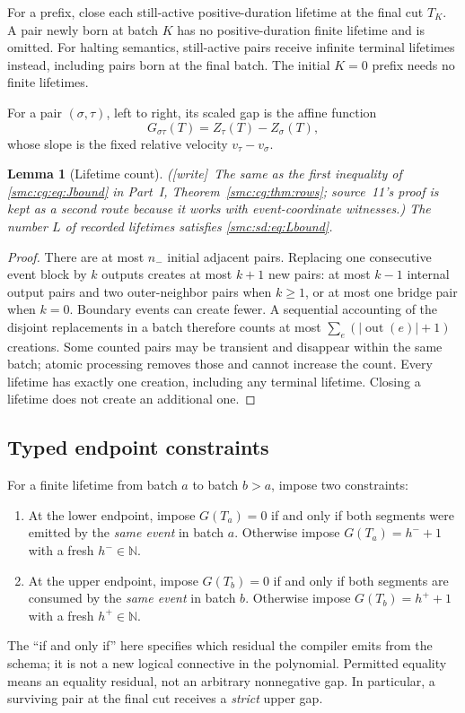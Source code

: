 \documentclass[11pt,letterpaper]{article}
\numberwithin{equation}{section}
\newtheorem{lemma}[theorem]{Lemma}
\theoremstyle{definition}
\theoremstyle{remark}
\newcommand{\NN}{\mathbb N}
\newcommand{\out}{\operatorname{out}}
\newcommand{\nminus}{n_{-}}
\newcommand{\wtag}{\textup{[write]}}
\begin{document}
For a prefix, close each still-active positive-duration lifetime at the final cut $T_K$. A pair newly born at batch $K$ has no positive-duration finite lifetime and is omitted. For halting semantics, still-active pairs receive infinite terminal lifetimes instead, including pairs born at the final batch. The initial $K=0$ prefix needs no finite lifetimes.

For a pair $(\sigma,\tau)$, left to right, its scaled gap is the affine function
\begin{equation}\label{smc:sd:eq:gap}
 G_{\sigma\tau}(T)=Z_\tau(T)-Z_\sigma(T),
\end{equation}
whose slope is the fixed relative velocity $v_\tau-v_\sigma$.

\begin{lemma}[Lifetime count]\label{smc:sd:lem:lifetimes}
(\wtag\ The same as the first inequality of \eqref{smc:cg:eq:Jbound} in Part~I, Theorem~\ref{smc:cg:thm:rows}; source~11's proof is kept as a second route because it works with event-coordinate witnesses.) The number $L$ of recorded lifetimes satisfies \eqref{smc:sd:eq:Lbound}.
\end{lemma}
\begin{proof}
There are at most $\nminus$ initial adjacent pairs. Replacing one consecutive event block by $k$ outputs creates at most $k+1$ new pairs: at most $k-1$ internal output pairs and two outer-neighbor pairs when $k\ge1$, or at most one bridge pair when $k=0$. Boundary events can create fewer. A sequential accounting of the disjoint replacements in a batch therefore counts at most $\sum_e(|\out(e)|+1)$ creations. Some counted pairs may be transient and disappear within the same batch; atomic processing removes those and cannot increase the count. Every lifetime has exactly one creation, including any terminal lifetime. Closing a lifetime does not create an additional one.
\end{proof}

\subsection{Typed endpoint constraints}\label{smc:sd:sec:endpoints}
For a finite lifetime from batch $a$ to batch $b>a$, impose two constraints:
\begin{enumerate}
\item At the lower endpoint, impose $G(T_a)=0$ if and only if both segments were emitted by the \emph{same event} in batch $a$. Otherwise impose $G(T_a)=h^-+1$ with a fresh $h^-\in\NN$.
\item At the upper endpoint, impose $G(T_b)=0$ if and only if both segments are consumed by the \emph{same event} in batch $b$. Otherwise impose $G(T_b)=h^++1$ with a fresh $h^+\in\NN$.
\end{enumerate}
The ``if and only if'' here specifies which residual the compiler emits from the schema; it is not a new logical connective in the polynomial. Permitted equality means an equality residual, not an arbitrary nonnegative gap. In particular, a surviving pair at the final cut receives a \emph{strict} upper gap.
\end{document}
